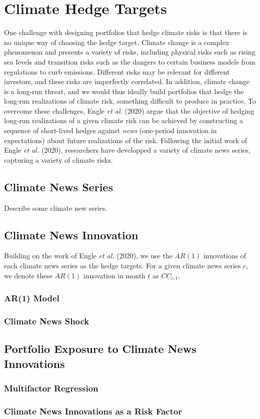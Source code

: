 \chapter{Climate Hedge Targets}

One challenge with designing portfolios 
that hedge climate risks is that there is no unique way of choosing the hedge target.
Climate change is a complex phenomenon and presents
a variety of risks, including physical risks such as rising sea levels and transition risks such
as the dangers to certain business models from regulations to curb emissions. 
Different risks may be relevant for different investors, 
and these risks are imperfectly correlated. In
addition, climate change is a long-run threat, 
and we would thus ideally build portfolios that
hedge the long-run realizations of climate risk, 
something difficult to produce in practice.
To overcome these challenges, 
Engle \textit{et al.} (2020) \cite{engle2020hedging} argue that 
the objective of hedging long-run realizations of a given climate risk
can be achieved by constructing a sequence of short-lived hedges against 
\textit{news} (one-period innovation in expectations) about future 
realizations of the risk. Following the initial work of Engle \textit{et al.} (2020),
researchers have developped a variety of climate news series, capturing 
a variety of climate risks. 

\section{Climate News Series}

Describe some climate new series.

\section{Climate News Innovation}

Building on the work of Engle \textit{et al.} (2020), 
we use the $AR(1)$ innovations of each climate news series as the hedge targets.
For a given climate news series $c$, we denote these $AR(1)$ innovation 
in month $t$ as $CC_{c,t}$.

\subsection{AR(1) Model}

\subsection{Climate News Shock}

\section{Portfolio Exposure to Climate News Innovations}

\subsection{Multifactor Regression}

\subsection{Climate News Innovations as a Risk Factor}